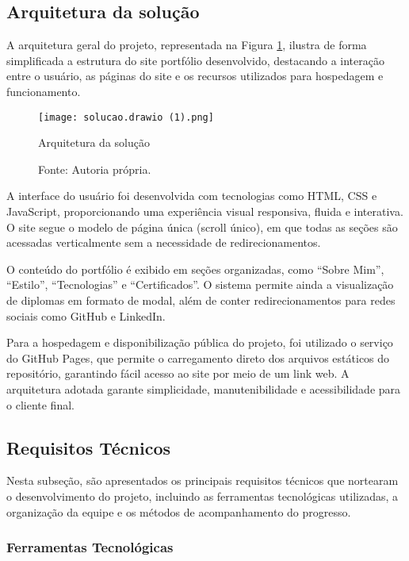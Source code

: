 \subsection{Arquitetura da solução}

A arquitetura geral do projeto, representada na Figura \ref{fig:Arquitetura da solução}, ilustra de forma simplificada a estrutura do site portfólio desenvolvido, destacando a interação entre o usuário, as páginas do site e os recursos utilizados para hospedagem e funcionamento.

\begin{figure}[h!]
    \centering
    \texttt{[image: solucao.drawio (1).png]}
    \caption{Arquitetura da solução}
    \caption*{Fonte: Autoria própria.}
    \label{fig:Arquitetura da solução}
\end{figure}

A interface do usuário foi desenvolvida com tecnologias como HTML, CSS e JavaScript, proporcionando uma experiência visual responsiva, fluida e interativa. O site segue o modelo de página única (scroll único), em que todas as seções são acessadas verticalmente sem a necessidade de redirecionamentos.

O conteúdo do portfólio é exibido em seções organizadas, como “Sobre Mim”, “Estilo”, “Tecnologias” e “Certificados”. O sistema permite ainda a visualização de diplomas em formato de modal, além de conter redirecionamentos para redes sociais como GitHub e LinkedIn.

Para a hospedagem e disponibilização pública do projeto, foi utilizado o serviço do GitHub Pages, que permite o carregamento direto dos arquivos estáticos do repositório, garantindo fácil acesso ao site por meio de um link web. A arquitetura adotada garante simplicidade, manutenibilidade e acessibilidade para o cliente final.

\subsection{Requisitos Técnicos}

Nesta subseção, são apresentados os principais requisitos técnicos que nortearam o desenvolvimento do projeto, incluindo as ferramentas tecnológicas utilizadas, a organização da equipe e os métodos de acompanhamento do progresso.

\subsubsection{Ferramentas Tecnológicas}

